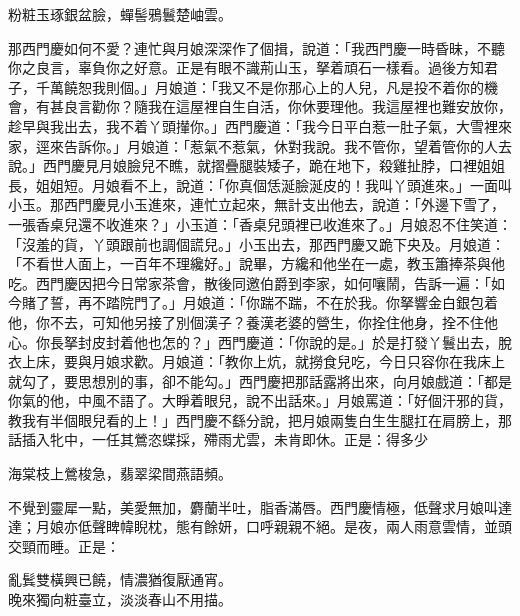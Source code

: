 \begin{myquote} 
粉粧玉琢銀盆臉，蟬髻鴉鬟楚岫雲。{}
\end{myquote} 

那西門慶如何不愛？{}連忙與月娘深深作了個揖，說道：「我西門慶一時昏昧，不聽你之良言，辜負你之好意。正是有眼不識荊山玉，拏着頑石一樣看。過後方知君子，千萬饒恕我則個。」月娘道：「我又不是你那心上的人兒，凡是投不着你的機會，有甚良言勸你？隨我在這屋裡自生自活，你休要理他。我這屋裡也難安放你，趁早與我出去，我不着丫頭攆你。」西門慶道：「我今日平白惹一肚子氣，大雪裡來家，逕來告訴你。」月娘道：「惹氣不惹氣，休對我說。我不管你，望着管你的人去說。」西門慶見月娘臉兒不瞧，就摺疊腿裝矮子，跪在地下，殺雞扯脖，口裡姐姐長，姐姐短。月娘看不上，說道：「你真個恁涎臉涎皮的！我叫丫頭進來。」一面叫小玉。那西門慶見小玉進來，連忙立起來，無計支出他去，說道：「外邊下雪了，一張香桌兒還不收進來？」小玉道：「香桌兒頭裡已收進來了。」月娘忍不住笑道：「沒羞的貨，丫頭跟前也調個謊兒。」{}小玉出去，那西門慶又跪下央及。月娘道：「不看世人面上，一百年不理纔好。」說畢，方纔和他坐在一處，教玉簫捧茶與他吃。西門慶因把今日常家茶會，散後同邀伯爵到李家，如何嚷鬧，告訴一遍：「如今賭了誓，再不踏院門了。」月娘道：「你踹不踹，不在於我。你拏響金白銀包着他，你不去，可知他另接了別個漢子？養漢老婆的營生，你拴住他身，拴不住他心。你長拏封皮封着他也怎的？」西門慶道：「你說的是。」於是打發丫鬟出去，脫衣上床，要與月娘求歡。月娘道：「教你上炕，就撈食兒吃，今日只容你在我床上就勾了，要思想別的事，卻不能勾。」西門慶把那話露將出來，向月娘戲道：「都是你氣的他，中風不語了。大睜着眼兒，說不出話來。」月娘罵道：「好個汗邪的貨，教我有半個眼兒看的上！」西門慶不繇分說，把月娘兩隻白生生腿扛在肩膀上，那話插入牝中，一任其鶯恣蝶採，殢雨尤雲，未肯即休。正是：得多少

\begin{myquote} 
海棠枝上鶯梭急，翡翠梁間燕語頻。
\end{myquote} 

不覺到靈犀一點，美愛無加，麝蘭半吐，脂香滿唇。西門慶情極，低聲求月娘叫達達；月娘亦低聲睥幃睨枕，態有餘妍，{}口呼親親不絕。是夜，兩人雨意雲情，並頭交頸而睡。正是：

\begin{myquote} 
亂鬂雙橫興已饒，情濃猶復厭通宵。\\晚來獨向粧臺立，淡淡春山不用描。
\end{myquote} 

